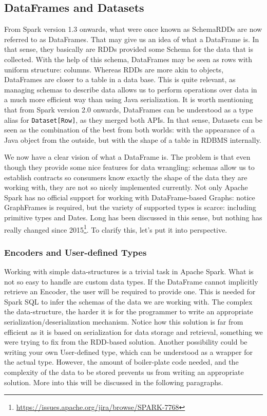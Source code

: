 \subsection{DataFrames and Datasets}

From Spark version 1.3 onwards, what were once known as SchemaRDDs are now referred to as DataFrames. That may give us an idea of what a DataFrame is. In that sense, they basically are RDDs provided some Schema for the data that is collected. With the help of this schema, DataFrames may be seen as rows with uniform structure: columns. Whereas RDDs are more akin to objects, DataFrames are closer to a table in a data base. This is quite relevant, as managing schemas to describe data allows us to perform operations over data in a much more efficient way than using Java serialization. It is worth mentioning that from Spark version 2.0 onwards, DataFrames can be understood as a type alias for \texttt{Dataset[Row]}, as they merged both APIs. In that sense, Datasets can be seen as the combination of the best from both worlds: with the appearance of a Java object from the outside, but with the shape of a table in RDBMS internally.

We now have a clear vision of what a DataFrame is. The problem is that even though they provide some nice features for data wrangling: schemas allow us to establish contracts so consumers know exactly the shape of the data they are working with, they are not so nicely implemented currently. Not only Apache Spark has no official support for working with DataFrame-based Graphs: notice GraphFrames is required, but the variety of supported types is scarce: including primitive types and Dates. Long has been discussed in this sense, but nothing has really changed since 2015\footnote{\url{https://issues.apache.org/jira/browse/SPARK-7768}}. To clarify this, let's put it into perspective.

\subsubsection{Encoders and User-defined Types}

Working with simple data-structures is a trivial task in Apache Spark. What is not so easy to handle are custom data types. If the DataFrame cannot implicitly retrieve an Encoder, the user will be required to provide one. This is needed for Spark SQL to infer the schemas of the data we are working with. The complex the data-structure, the harder it is for the programmer to write an appropriate serialization/deserialization mechanism. Notice how this solution is far from efficient as it is based on serialization for data storage and retrieval, something we were trying to fix from the RDD-based solution. Another possibility could be writing your own User-defined type, which can be understood as a wrapper for the actual type. However, the amount of boiler-plate code needed, and the complexity of the data to be stored prevents us from writing an appropriate solution. More into this will be discussed in the following paragraphs.

